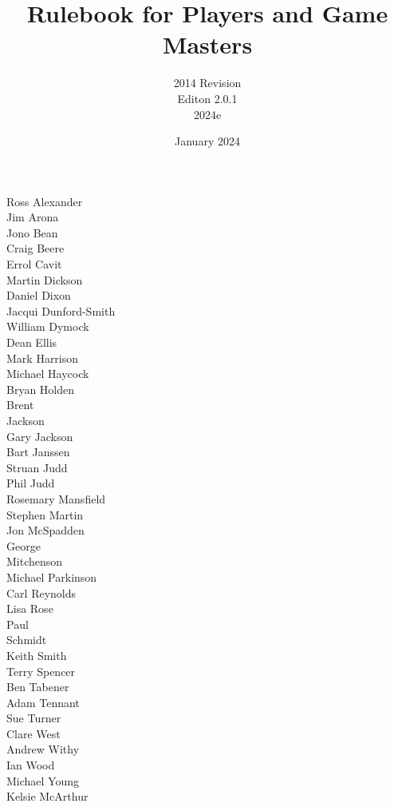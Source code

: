 \documentclass[a4paper]{report}
\begin{document}
\title{Rulebook for Players and Game Masters\\ \coverpic}
\author{2014 Revision\\Editon 2.0.1\\2024e}
\date{January 2024}

\maketitle

\begin{Contributors}
Ross Alexander \\
Jim Arona \\
Jono Bean \\
Craig Beere \\
Errol Cavit \\
Martin Dickson \\
Daniel Dixon \\
Jacqui Dunford-Smith \\
William Dymock \\
Dean Ellis \\
Mark Harrison \\
Michael Haycock \\
Bryan Holden \\
Brent \\
Jackson \\
Gary Jackson \\
Bart Janssen \\
Struan Judd \\
Phil Judd \\
Rosemary Mansfield \\
Stephen Martin \\
Jon McSpadden \\
George \\
Mitchenson \\
Michael Parkinson \\
Carl Reynolds \\
Lisa Rose \\
Paul \\
Schmidt \\
Keith Smith \\
Terry Spencer \\
Ben Tabener \\
Adam Tennant \\
Sue Turner \\
Clare West \\
Andrew Withy \\
Ian Wood \\
Michael Young \\
Kelsie McArthur \\
\end{Contributors}
\end{document}
